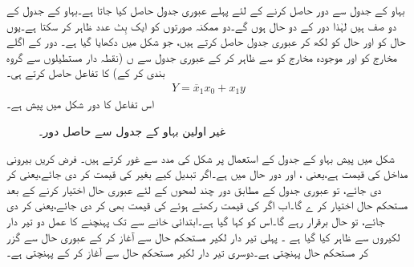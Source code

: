  بہاو کے جدول سے دور حاصل کرنے کے لئے پہلے عبوری جدول حاصل کیا جاتا ہے۔بہاو کے جدول کے دو صف ہیں لہٰذا دور کے دو حال ہوں گے۔دو ممکنہ صورتوں کو ایک بِٹ عدد ظاہر کر سکتا ہے۔یوں حال  کو  اور حال  کو  لکھ کر عبوری جدول حاصل کرتے ہیں، جو شکل  میں دکھایا گیا ہے۔ دور کے اگلے مخارج کو  اور موجودہ مخارج کو  سے ظاہر کر کے عبوری جدول سے ں (نقطہ دار مستطیلوں سے گروہ بندی کر کے)   کا تفاعل حاصل کرتے ہی۔
\begin{align}
Y=\overline{x}_1x_0+x_1y
\end{align}
اس تفاعل کا دور شکل  میں  پیش  ہے۔

\begin{figure}
\centering
{}
\caption{غیر اولین بہاو کے جدول سے حاصل دور۔}
\label{شکل_غیر_معاصر_غیر_اولین_سے_دور}
\end{figure}

 شکل   میں پیش بہاو کے جدول کے استعمال پر شکل    کی مدد سے غور کرتے ہیں۔ فرض کریں بیرونی مداخل  کی قیمت  ہے،یعنی  ، اور دور حال  میں ہے۔اگر  تبدیل کیے بغیر  کی قیمت  کر دی جائے،یعنی  کر دی جائے، تو عبوری جدول کے مطابق دور چند لمحوں کے لئے عبوری حال  اختیار کرنے کے بعد مستحکم حال  اختیار کر ے گا۔اب اگر  کی قیمت  رکھتے ہوئے  کی قیمت بھی  کر دی جائے،یعنی  کر دی جائے، تو حال  برقرار رہے گا۔اس  کو کہا گیا ہے۔ابتدائی خانے سے تک پہنچنے کا عمل    دو تیر دار لکیروں  سے ظاہر کیا گیا ہے ۔ پہلی  تیر دار لکیر مستحکم حال  سے  آغاز کر کے  عبوری حال   سے گزر کر  مستحکم حال   پہنچتی ہے۔دوسری تیر دار لکیر  مستحکم حال  سے آغاز کر کے   پہنچتی ہے۔

